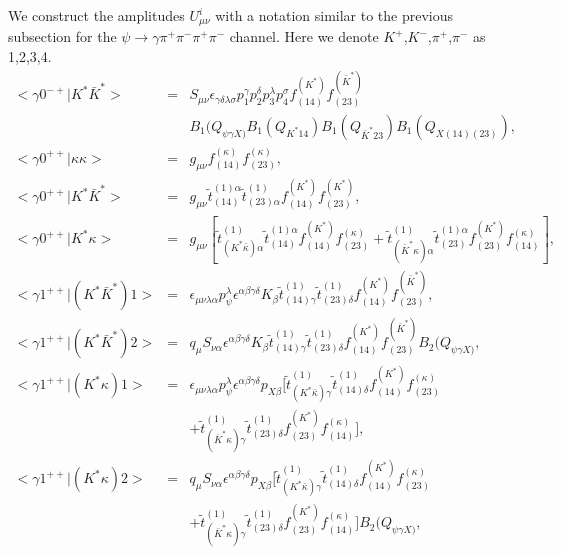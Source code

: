 We construct the amplitudes $U^i_{\mu\nu}$ with a notation similar
to the previous subsection for the
$\psi\to\gamma\pi^+\pi^-\pi^+\pi^-$ channel. Here we denote
$K^+$,$K^-$,$\pi^+$,$\pi^-$ as 1,2,3,4.
\begin{eqnarray}
<\gamma 0^{-+}|K^*\bar K^*> \!&=&\! S_{\mu\nu}
\epsilon_{\gamma\delta\lambda\sigma}p_1^\gamma p_2^\delta
p_3^\lambda p_4^\sigma f_{(14)}^{(K^*)}f_{(23)}^{(\bar K^*)}
\nonumber \\  &  & B_1(Q_{\psi\gamma X)}
B_1(Q_{K^* 14})B_1(Q_{\bar K^*23})B_1(Q_{X(14)(23)}), \\
<\gamma 0^{++}|\kappa\kappa> \!&=&\!
g_{\mu\nu}f_{(14)}^{(\kappa)}f_{(23)}^{(\kappa)},
                \\
<\gamma 0^{++}|K^*\bar K^* > \!&=&\! g_{\mu\nu}
\tilde{t}^{(1)\alpha}_{(14)} \tilde{t}^{(1)}_{(23)\alpha}
f_{(14)}^{(K^*)}f_{(23)}^{(K^*)},
                \\
<\gamma 0^{++}|K^*\kappa> \!&=&\! g_{\mu\nu} [\tilde
t^{(1)}_{(K^*\bar\kappa)\alpha}\tilde{t}_{(14)}^{(1)\alpha}
f_{(14)}^{(K^*)}f_{(23)}^{(\kappa)} +\tilde t^{(1)}_{(\bar
K^*\kappa)\alpha} \tilde{t}_{(23)}^{(1)\alpha}
f_{(23)}^{(K^*)}f_{(14)}^{(\kappa)}],
                \\
<\gamma 1^{++}|(K^*\bar K^*)1> \!&=&\!
\epsilon_{\mu\nu\lambda\alpha}p_\psi^\lambda
\epsilon^{\alpha\beta\gamma\delta}
K_{\beta}\tilde{t}^{(1)}_{(14)\gamma}\tilde{t}^{(1)}_{(23)\delta}
                f_{(14)}^{(K^*)}f_{(23)}^{(\bar K^*)}, \\
<\gamma 1^{++}|(K^*\bar K^*)2> \!&=&\! q_\mu S_{\nu\alpha}
\epsilon^{\alpha\beta\gamma\delta}
K_{\beta}\tilde{t}^{(1)}_{(14)\gamma}\tilde{t}^{(1)}_{(23)\delta}
f_{(14)}^{(K^*)}f_{(23)}^{(\bar K^*)}B_2(Q_{\psi\gamma X)}, \\
<\gamma 1^{++}|(K^*\kappa)1> \!&=&\!
\epsilon_{\mu\nu\lambda\alpha}p_\psi^\lambda
\epsilon^{\alpha\beta\gamma\delta} p_{X\beta} [\tilde
t^{(1)}_{(K^*\bar\kappa)\gamma}\tilde t^{(1)}_{(14)\delta}
f_{(14)}^{(K^*)}f_{(23)}^{(\kappa)} \nonumber\\
& &   +\tilde t^{(1)}_{(\bar K^*\kappa)\gamma}\tilde
t^{(1)}_{(23)\delta}
f_{(23)}^{(K^*)}f_{(14)}^{(\kappa)}], \\
<\gamma 1^{++}|(K^*\kappa)2> \!&=&\! q_\mu S_{\nu\alpha}
\epsilon^{\alpha\beta\gamma\delta} p_{X\beta}[\tilde
t^{(1)}_{(K^*\bar\kappa)\gamma}\tilde t^{(1)}_{(14)\delta}
f_{(14)}^{(K^*)}f_{(23)}^{(\kappa)} \nonumber\\
& &   +\tilde t^{(1)}_{(\bar K^*\kappa)\gamma}\tilde
t^{(1)}_{(23)\delta}
f_{(23)}^{(K^*)}f_{(14)}^{(\kappa)}]B_2(Q_{\psi\gamma X)}, \\

\end{eqnarray}
